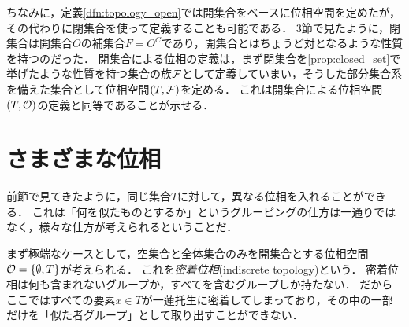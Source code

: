 \documentclass[11pt,a4paper, dvipdfmx]{jsarticle}
\begin{document}
ちなみに，定義\ref{dfn:topology_open}では開集合をベースに位相空間を定めたが，その代わりに閉集合を使って定義することも可能である．
3節で見たように，閉集合は開集合$O$の補集合$F = O^C$であり，開集合とはちょうど対となるような性質を持つのだった．
閉集合による位相の定義は，まず閉集合を\ref{prop:closed_set}で挙げたような性質を持つ集合の族$\mathcal{F}$として定義していまい，そうした部分集合系を備えた集合として位相空間$(T, \mathcal{F})$を定める．
これは開集合による位相空間$(T, \mathcal{O})$の定義と同等であることが示せる．






\section{さまざまな位相}
前節で見てきたように，同じ集合$T$に対して，異なる位相を入れることができる．
これは「何を似たものとするか」というグルーピングの仕方は一通りではなく，様々な仕方が考えられるということだ．

まず極端なケースとして，空集合と全体集合のみを開集合とする位相空間$\mathcal{O} = \{\emptyset, T\}$が考えられる．
これを\emph{密着位相}(indiscrete topology)という．
密着位相は何も含まれないグループか，すべてを含むグループしか持たない．
だからここではすべての要素$x \in T$が一蓮托生に密着してしまっており，その中の一部だけを「似た者グループ」として取り出すことができない．
\end{document}
